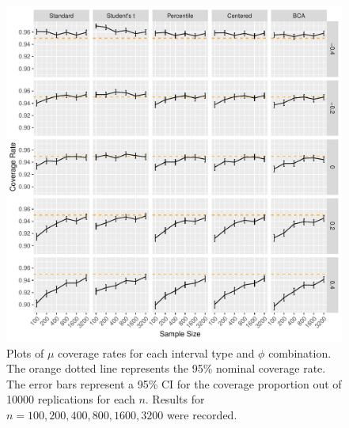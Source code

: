 \documentclass[12pt, letterpaper, titlepage]{article}
\begin{document}
\begin{figure}[tbp]
  \centering
  \includegraphics[width=\textwidth]{figures/plot_mu}
  \caption{Plots of $\mu$ coverage rates for each interval type and $\phi$
    combination. The orange dotted line represents the 95\% nominal coverage
    rate. The error bars represent a 95\% CI for the coverage
    proportion out of 10000 replications for each $n$. Results for 
    $n = 100, 200, 400, 800, 1600, 3200$ were recorded.}
  \label{fig:mu}
\end{figure}
\end{document}
